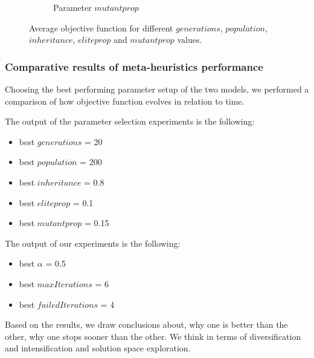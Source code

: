 \begin{figure}[H]
\begin{subfigure}[b]{.49\linewidth}
\caption{Parameter $mutantprop$ }\label{fig2e}
\end{subfigure}%
\caption{Average objective function for different  $generations$,  $population$,  $inheritance$,  $eliteprop$ and  $mutantprop$ values.  }
\label{fig_brkga_params}
\end{figure}





\subsubsection{Comparative results of meta-heuristics performance}

Choosing the best performing parameter setup of the two models, we performed a comparison of how objective function evolves in relation to time.

The output of the parameter selection experiments is the following: 
\begin{itemize}
	\item best $generations$ = 20
	\item best $population$ = 200
	\item best $inheritance$ = 0.8
	\item best $eliteprop$ = 0.1
	\item best $mutantprop$ = 0.15
\end{itemize}

The output of our experiments is the following: 
\begin{itemize}
	\item best $\alpha$ = 0.5
	\item best $maxIterations$ = 6
	\item best $failedIterations$ = 4
\end{itemize}


Based on the results, we draw conclusions about, why one is better than the other, why one stops sooner than the other. We think in terms of diversification and intensification and solution space exploration.\\

\pagebreak